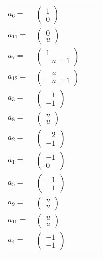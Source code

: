 \documentclass[1p]{elsarticle_modified}
\theoremstyle{definition}
\begin{document}
\begin{tabular}{m{7pt} m{180pt} m{7pt} m{180pt} }
\flushright $a_{6}=$&$\begin{pmatrix}1\\0\end{pmatrix}$ \\
\flushright $a_{11}=$&$\begin{pmatrix}0\\u\end{pmatrix}$ \\
\flushright $a_{7}=$&$\begin{pmatrix}1\\- u+1\end{pmatrix}$ \\
\flushright $a_{12}=$&$\begin{pmatrix}- u\\- u+1\end{pmatrix}$ \\
\flushright $a_{3}=$&$\begin{pmatrix}-1\\-1\end{pmatrix}$ \\
\flushright $a_{8}=$&$\begin{pmatrix}u\\u\end{pmatrix}$ \\
\flushright $a_{2}=$&$\begin{pmatrix}-2\\-1\end{pmatrix}$ \\
\flushright $a_{1}=$&$\begin{pmatrix}-1\\0\end{pmatrix}$ \\
\flushright $a_{5}=$&$\begin{pmatrix}-1\\-1\end{pmatrix}$ \\
\flushright $a_{9}=$&$\begin{pmatrix}u\\u\end{pmatrix}$ \\
\flushright $a_{10}=$&$\begin{pmatrix}u\\u\end{pmatrix}$ \\
\flushright $a_{4}=$&$\begin{pmatrix}-1\\-1\end{pmatrix}$\\&\end{tabular}
\end{document}
